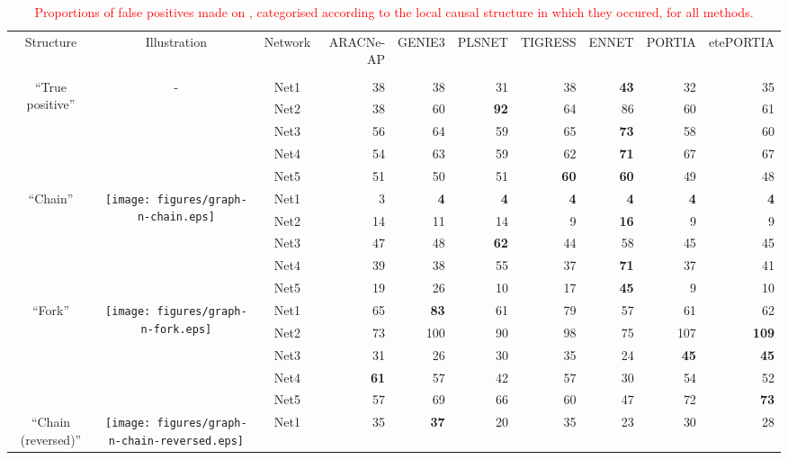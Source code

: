 \begin{table*}[t]
\caption{\textcolor{red}{Proportions of false positives made on \dreamfourmf, categorised according to the local causal structure in which they occured, for all methods.}\label{tab:fp-categories-dream4mf}}\begin{adjustbox}{max width=\textwidth}\color{red}\begin{tabular}{cccrrrrrrr} \\ \toprule
Structure & Illustration & Network & ARACNe-AP & GENIE3 & PLSNET & TIGRESS & ENNET & PORTIA & etePORTIA \\
          
 &  &  &  &  &  &  &  &  &  \\ \midrule
\multirow{5}{*}{``True positive''} & \multirow{5}{*}{-} & Net1 & 38 & 38 & 31 & 38 & \textbf{43} & 32 & 35 \\
  &   & Net2 & 38 & 60 & \textbf{92} & 64 & 86 & 60 & 61 \\
  &   & Net3 & 56 & 64 & 59 & 65 & \textbf{73} & 58 & 60 \\
  &   & Net4 & 54 & 63 & 59 & 62 & \textbf{71} & 67 & 67 \\
  &   & Net5 & 51 & 50 & 51 & \textbf{60} & \textbf{60} & 49 & 48 \\
\midrule
\multirow{5}{*}{``Chain''} & \multirow{5}{*}{\texttt{[image: figures/graph-n-chain.eps]}} & Net1 & 3 & \textbf{4} & \textbf{4} & \textbf{4} & \textbf{4} & \textbf{4} & \textbf{4} \\
  &   & Net2 & 14 & 11 & 14 & 9 & \textbf{16} & 9 & 9 \\
  &   & Net3 & 47 & 48 & \textbf{62} & 44 & 58 & 45 & 45 \\
  &   & Net4 & 39 & 38 & 55 & 37 & \textbf{71} & 37 & 41 \\
  &   & Net5 & 19 & 26 & 10 & 17 & \textbf{45} & 9 & 10 \\
\midrule
\multirow{5}{*}{``Fork''} & \multirow{5}{*}{\texttt{[image: figures/graph-n-fork.eps]}} & Net1 & 65 & \textbf{83} & 61 & 79 & 57 & 61 & 62 \\
  &   & Net2 & 73 & 100 & 90 & 98 & 75 & 107 & \textbf{109} \\
  &   & Net3 & 31 & 26 & 30 & 35 & 24 & \textbf{45} & \textbf{45} \\
  &   & Net4 & \textbf{61} & 57 & 42 & 57 & 30 & 54 & 52 \\
  &   & Net5 & 57 & 69 & 66 & 60 & 47 & 72 & \textbf{73} \\
\midrule
\multirow{5}{*}{``Chain (reversed)''} & \multirow{5}{*}{\texttt{[image: figures/graph-n-chain-reversed.eps]}} & Net1 & 35 & \textbf{37} & 20 & 35 & 23 & 30 & 28 \\

\end{tabular}
\end{adjustbox}
\end{table*}
